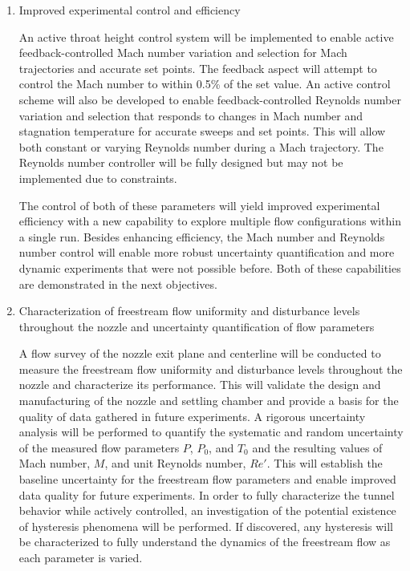 \begin{enumerate}[listparindent=\parindent]
    \item Improved experimental control and efficiency
            
        An active throat height control system will be implemented to enable active feedback-controlled Mach number variation and selection for Mach trajectories and accurate set points. The feedback aspect will attempt to control the Mach number to within 0.5\% of the set value. An active control scheme will also be developed to enable feedback-controlled Reynolds number variation and selection that responds to changes in Mach number and stagnation temperature for accurate sweeps and set points. This will allow both constant or varying Reynolds number during a Mach trajectory. The Reynolds number controller will be fully designed but may not be implemented due to constraints.

        The control of both of these parameters will yield improved experimental efficiency with a new capability to explore multiple flow configurations within a single run. Besides enhancing efficiency, the Mach number and Reynolds number control will enable more robust uncertainty quantification and more dynamic experiments that were not possible before. Both of these capabilities are demonstrated in the next objectives.

    \item Characterization of freestream flow uniformity and disturbance levels throughout the nozzle and uncertainty quantification of flow parameters

        A flow survey of the nozzle exit plane and centerline will be conducted to measure the freestream flow uniformity and disturbance levels throughout the nozzle and characterize its performance. This will validate the design and manufacturing of the nozzle and settling chamber and provide a basis for the quality of data gathered in future experiments. A rigorous uncertainty analysis will be performed to quantify the systematic and random uncertainty of the measured flow parameters $P$, $P_0$, and $T_0$ and the resulting values of Mach number, $M$, and unit Reynolds number, $Re'$. This will establish the baseline uncertainty for the freestream flow parameters and enable improved data quality for future experiments. In order to fully characterize the tunnel behavior while actively controlled, an investigation of the potential existence of hysteresis phenomena will be performed. If discovered, any hysteresis will be characterized to fully understand the dynamics of the freestream flow as each parameter is varied.


\end{enumerate}
